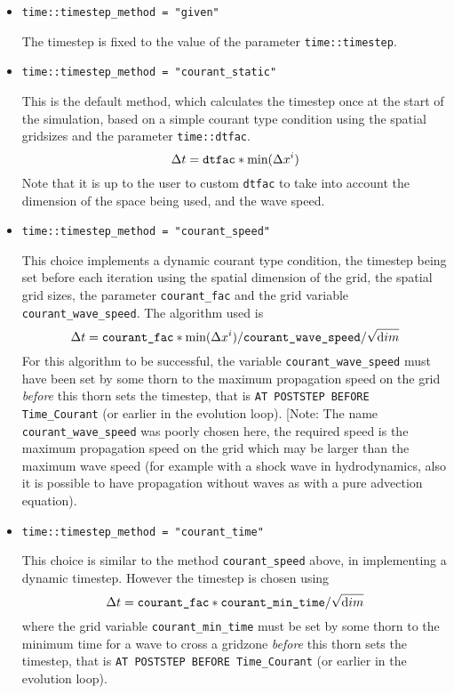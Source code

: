 \documentclass{article}
\begin{document}
\begin{itemize}

\item{} {\tt time::timestep\_method = "given"} 

	The timestep is fixed to the
	value of the parameter {\tt time::timestep}. 

\item{} {\tt time::timestep\_method = "courant\_static"} 

	This is the default
	method, which calculates the timestep once at the start of the
	simulation, based on a simple courant type condition using 
	the spatial gridsizes and the parameter {\tt time::dtfac}.
$$
\Delta t = \mbox{\tt dtfac} * \mbox{min}(\Delta x^i)
$$
	Note that it is up to the user to custom {\tt dtfac} to take
	into account the dimension of the space being used, and the wave speed.

\item{} {\tt time::timestep\_method = "courant\_speed"} 

	This choice implements a 
	dynamic courant type condition, the timestep being set before each
	iteration using the spatial dimension of the grid, the spatial grid sizes, the 
	parameter {\tt courant\_fac} and the grid variable {\tt courant\_wave\_speed}. 
	The algorithm used is
$$
\Delta t = \mbox{\tt courant\_fac} * \mbox{min}(\Delta x^i)/\mbox{\tt courant\_wave\_speed}/\sqrt{\mbox dim}
$$
	For this algorithm to be successful, the variable {\tt courant\_wave\_speed}
	must have been set by some thorn to the maximum propagation speed on the grid {\it before}
	this thorn sets the timestep, that is {\tt AT POSTSTEP BEFORE Time\_Courant} (or earlier 
	in the evolution loop). [Note: The name {\tt courant\_wave\_speed} was poorly 
	chosen here, the required speed is the maximum propagation speed on 
        the grid which may be larger than the maximum wave speed (for example
        with a shock wave in hydrodynamics, also it is possible to have
        propagation without waves as with a pure advection equation).

\item{} {\tt time::timestep\_method = "courant\_time"} 

	This choice is similar to the
	method {\tt courant\_speed} above, in implementing a dynamic timestep.
	However the timestep is chosen using
$$
\Delta t = \mbox{\tt courant\_fac} * \mbox{\tt courant\_min\_time}/\sqrt{\mbox dim}
$$
        where the grid variable {\tt courant\_min\_time} must be set by some thorn to
	the minimum time for a wave to cross a gridzone {\it before}
	this thorn sets the timestep, that is {\tt AT POSTSTEP BEFORE Time\_Courant} (or earlier 
	in the evolution loop). 

\end{itemize}
\end{document}
